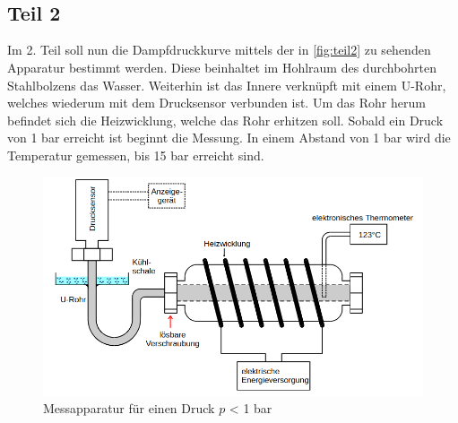 \\
\\
\\
\\
\\
\\
\\
\\
\\
\\
\\
\\
\subsection{Teil 2}
Im 2. Teil soll nun die Dampfdruckkurve mittels der in \autoref{fig:teil2} zu 
sehenden Apparatur bestimmt werden. Diese beinhaltet im Hohlraum des durchbohrten 
Stahlbolzens das Wasser. Weiterhin ist das Innere verknüpft mit einem U-Rohr, 
welches wiederum mit dem Drucksensor verbunden ist. Um das Rohr herum befindet 
sich die Heizwicklung, welche das Rohr erhitzen soll. Sobald ein Druck von 1 bar 
erreicht ist beginnt die Messung. In einem Abstand von 1 bar wird die Temperatur 
gemessen, bis 15 bar erreicht sind.
\begin{figure}[h!]
    \centering
        \centering
        \includegraphics[width=\textwidth]{Bilder/teil2.png}
        \caption{Messapparatur für einen Druck $p$ < 1 bar \cite{teil2}}
    \hfill
    \label{fig:teil2}
\end{figure}